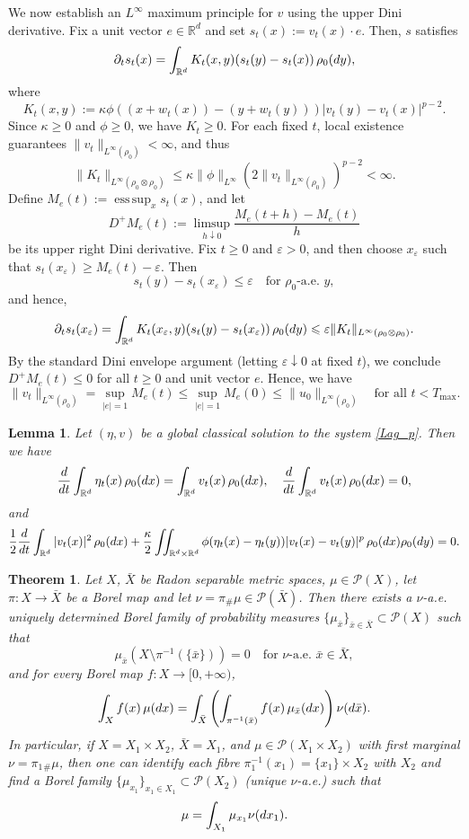 \documentclass[10pt,a4paper]{amsart}
\newtheorem{theorem}{Theorem}
\newtheorem{lemma}{Lemma}
\newcommand{\R}{\mathbb R}
\newcommand{\bq}{\begin{equation}}
\newcommand{\calP}{\mathcal P}
\newcommand{\dt}{\textnormal{d}t}
\newcommand{\dx}{\textnormal{d}x}
\newcommand{\dy}{\textnormal{d}y}
\newcommand{\e}{\varepsilon}
\newcommand{\eq}{\end{equation}}
\DeclareMathOperator*{\esssup}{ess\,sup}
\renewcommand{\ge}{\geqslant}
\renewcommand{\geq}{\geqslant}
\newcommand{\intr}{\int_{\R^d}}
\newcommand{\intrr}{\iint_{\R^d \times \R^d}}
\renewcommand{\le}{\leqslant}
\newcommand{\lt}{\left}
\newcommand{\pa}{\partial}
\newcommand{\rd}{\textnormal{d}}
\newcommand{\rt}{\right}
\begin{document}
We now establish an $L^\infty$ maximum principle for $v$ using the upper Dini derivative. Fix a unit vector $e\in\R^d$ and set $s_t(x):=v_t(x)\cdot e$. Then, $s$ satisfies
\[
\pa_t s_t(x) =\intr K_t(x,y) (s_t(y)-s_t(x))\,\rho_0(\dy),
\]
where
\[
K_t(x,y):=\kappa \phi ((x+w_t(x))-(y+w_t(y)))|v_t(y)-v_t(x)|^{p-2}.
\]
Since $\kappa\ge0$ and $\phi\ge0$, we have $K_t\ge0$. For each fixed $t$, local existence guarantees  $\|v_t\|_{L^\infty(\rho_0)}<\infty$, and thus
\[
\|K_t\|_{L^\infty(\rho_0\otimes\rho_0)} \le \kappa \|\phi\|_{L^\infty} \lt(2\|v_t\|_{L^\infty(\rho_0)}\rt)^{p-2}<\infty.
\]
Define $M_e(t):=\esssup_{x}s_t(x)$, and let 
\[
D^+M_e(t):=\limsup_{h\downarrow0}\frac{M_e(t+h)-M_e(t)}{h}
\]
be its upper right Dini derivative. Fix $t\ge0$ and $\varepsilon>0$, and then choose $x_\e$ such that $s_t(x_\e)\ge M_e(t)-\e$. Then 
\[
s_t(y)-s_t(x_\e) \le \e \quad \text{for $\rho_0$-a.e.  $y$}, 
\]
and hence,
\[
\pa_t s_t(x_\e) =\intr K_t(x_\e,y)(s_t(y)-s_t(x_\e))\,\rho_0(\dy) \le \e \|K_t\|_{L^\infty(\rho_0\otimes\rho_0)}.
\]
By the standard Dini envelope argument (letting $\varepsilon\downarrow0$ at fixed $t$), we conclude $D^+M_e(t)\le0$ for all $t\geq 0$ and unit vector $e$.   Hence, we have
\bq\label{eq:v-Linf-decay}
\|v_t\|_{L^\infty(\rho_0)} =\sup_{|e|=1} M_e(t)\le \sup_{|e|=1} M_e(0)\le \|u_0\|_{L^\infty(\rho_0)} \quad\text{for all }t<T_{\max}.
\eq

\begin{lemma}\label{lem:apr} Let $(\eta,v)$ be a global classical solution to the system \eqref{Lag_p}. Then we have
\[
\frac{\rd}{\dt} \intr \eta_t(x)\,\rho_0(\dx) = \intr v_t(x)\,\rho_0(\dx), \quad \frac{\rd}{\dt}\intr v_t(x)\,\rho_0(\dx) =0,
\]
and
\[
\frac12 \frac{\rd}{\dt} \intr |v_t(x)|^2\,\rho_0(\dx) + \frac\kappa2\intrr \phi(\eta_t(x)-\eta_t(y))|v_t(x) - v_t(y)|^p \,\rho_0(\dx) \rho_0(\dy) =0.
\]
\end{lemma}

\begin{theorem}\label{thm:disint}
Let $X$, $\bar X$ be Radon separable metric spaces, $\mu \in \calP(X)$, let $\pi: X \to \bar X$ be a Borel map and let $\nu = \pi_\# \mu \in \calP(\bar X)$. Then there exists a $\nu$-a.e. uniquely determined Borel family of probability measures $\{\mu_{\bar x}\}_{\bar x \in \bar X} \subset \calP(X)$ such that
\[
\mu_{\bar x} (X \setminus \pi^{-1}(\{\bar x\})) = 0 \quad \text{for $\nu$-a.e. $\bar x \in \bar X$},
\]
and for every Borel map $f: X \to [0,+\infty)$,
\[
\int_X f(x)\,\mu(\dx) = \int_{\bar X} \lt(  \int_{\pi^{-1}(\bar x)} f(x) \,\mu_{\bar x}(\dx)\rt)  \nu(\rd\bar x).
\]
In particular, if $X = X_1 \times X_2$, $\bar X = X_1$, and $\mu \in \calP(X_1 \times X_2)$ with first marginal $\nu = \pi_1 {}_\# \mu$, then one can identify each fibre $\pi_1^{-1}(x_1) = \{x_1\} \times X_2$ with $X_2$ and find a Borel family $\{\mu_{x_1}\}_{x_1 \in X_1} \subset \calP(X_2)$ (unique $\nu$-a.e.) such that
\[
\mu = \int_{X_1} \mu_{x_1} \nu(\rd x_1).
\]
\end{theorem} 
\end{document}
